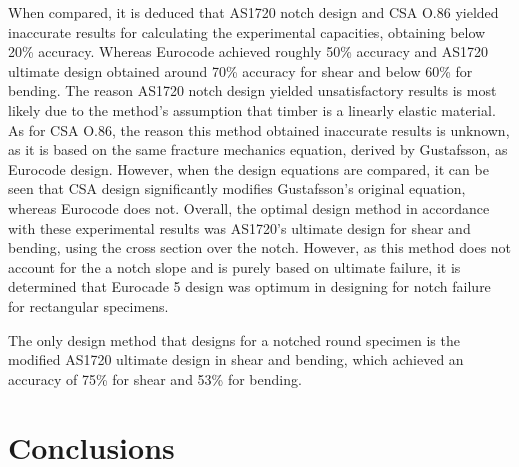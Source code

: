 \documentclass[11pt,a4paper]{article}
\numberwithin{equation}{subsection}
\begin{document}
\noindent
When compared, it is deduced that AS1720 notch design and CSA O.86 yielded inaccurate results for calculating the experimental capacities, obtaining below 20\% accuracy. Whereas Eurocode achieved roughly 50\% accuracy and AS1720 ultimate design obtained around 70\% accuracy for shear and below 60\% for bending. The reason AS1720 notch design yielded unsatisfactory results is most likely due to the method's assumption that timber is a linearly elastic material. As for CSA O.86, the reason this method obtained inaccurate results is unknown, as it is based on the same fracture mechanics equation, derived by Gustafsson, as Eurocode design. However, when the design equations are compared, it can  be seen that CSA design significantly modifies Gustafsson's original equation, whereas Eurocode does not. Overall, the optimal design method in accordance with these experimental results was AS1720's ultimate design for shear and bending, using the cross section over the notch. However, as this method does not account for the a notch slope and is purely based on ultimate failure, it is determined that Eurocade 5 design was optimum in designing for notch failure for rectangular specimens.

\vspace*{\baselineskip}

\noindent
The only design method that designs for a notched round specimen is the modified AS1720 ultimate design in shear and bending, which achieved an accuracy of 75\% for shear and 53\% for bending.  

\pagebreak	

\section{Conclusions}
\end{document}
